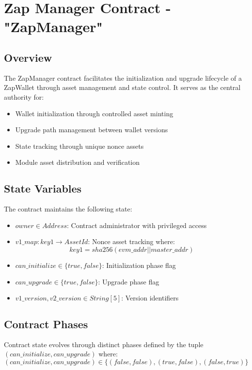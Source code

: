 \newpage
\section{Zap Manager Contract - {\ttfamily "ZapManager"}}
\label{sec:zapmanager_contract}


\subsection{Overview}
\label{subsec:overview-sec:zapmanager_contract}
The ZapManager contract facilitates the initialization and upgrade lifecycle of a ZapWallet through asset management and state control. It serves as the central authority for:

\begin{itemize}
    \item Wallet initialization through controlled asset minting
    \item Upgrade path management between wallet versions
    \item State tracking through unique nonce assets
    \item Module asset distribution and verification
\end{itemize}

\subsection{State Variables}
The contract maintains the following state:

\begin{itemize}
    \item $owner \in Address$: Contract administrator with privileged access
    \item $v1\_map: key1 \rightarrow AssetId$: Nonce asset tracking where:
        \[ key1 = sha256(evm\_addr || master\_addr) \]
    \item $can\_initialize \in \{true, false\}$: Initialization phase flag
    \item $can\_upgrade \in \{true, false\}$: Upgrade phase flag
    \item $v1\_version, v2\_version \in String[5]$: Version identifiers
\end{itemize}

\subsection{Contract Phases}
Contract state evolves through distinct phases defined by the tuple $(can\_initialize, can\_upgrade)$ where:
\[ (can\_initialize, can\_upgrade) \in \{(false,false), (true,false), (false,true)\} \]


